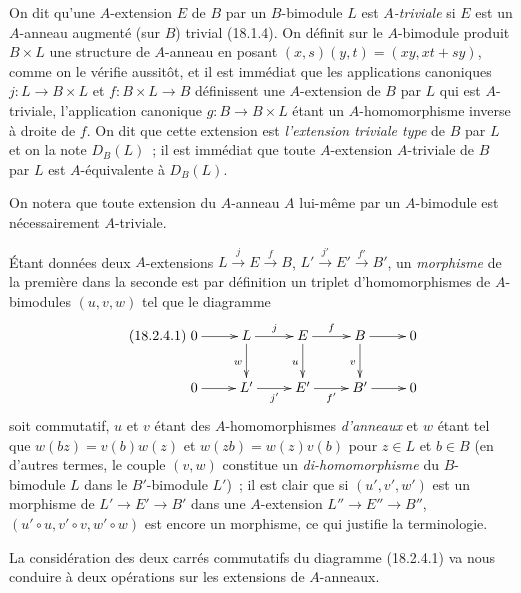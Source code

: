 \begin{env}[18.2.3]
\label{0.18.2.3-fr}
On dit qu'une $A$-extension $E$ de $B$ par un $B$-bimodule $L$ est
\emph{$A$-triviale} si $E$ est un $A$-anneau augmenté (sur $B$) trivial
(18.1.4). On définit sur le $A$-bimodule produit $B\times L$ une structure de
$A$-anneau en posant $(x,s)(y,t)=(xy,xt+sy)$, comme on le vérifie aussitôt,
et il est immédiat que les applications canoniques $j:L\to B\times L$ et
$f:B\times L\to B$ définissent une $A$-extension de $B$ par $L$ qui est
$A$-triviale, l'application canonique $g:B\to B\times L$ étant un
$A$-homomorphisme inverse à droite de $f$. On dit que cette extension est
\emph{l'extension triviale type} de $B$ par $L$ et on la note $D_B(L)$~; il
est immédiat que toute $A$-extension $A$-triviale de $B$ par $L$ est
$A$-équivalente à $D_B(L)$.

On notera que toute extension du $A$-anneau $A$ lui-même par un $A$-bimodule
est nécessairement $A$-triviale.
\end{env}

\begin{env}[18.2.4]
\label{0.18.2.4-fr}
Étant données deux $A$-extensions
$L\xrightarrow{j}E\xrightarrow{f}B$,
$L'\xrightarrow{j'}E'\xrightarrow{f'}B'$, un \emph{morphisme} de la première
dans la seconde est par définition un triplet d'homomorphismes de
$A$-bimodules $(u,v,w)$ tel que le diagramme
\begin{equation}
\label{0.18.2.4.1-fr}
\tag{18.2.4.1}
  \xymatrix{
    0\ar[r] & L\ar[r]^j\ar[d]_w & E\ar[r]^f\ar[d]_u
      & B\ar[r]\ar[d]_v & 0\\
    0\ar[r] & L'\ar[r]_{j'} & E'\ar[r]_{f'} & B'\ar[r] & 0
  }
\end{equation}
soit commutatif, $u$ et $v$ étant des $A$-homomorphismes \emph{d'anneaux} et
$w$ étant tel que $w(bz)=v(b)w(z)$ et $w(zb)=w(z)v(b)$ pour $z\in L$ et
$b\in B$ (en d'autres termes, le couple $(v,w)$ constitue un
\emph{di-homomorphisme} du $B$-bimodule $L$ dans le $B'$-bimodule $L'$)~; il
est clair que si $(u',v',w')$ est un morphisme de
$L'\to E'\to B'$ dans une $A$-extension $L''\to E''\to B''$,
$(u'\circ u,v'\circ v,w'\circ w)$ est encore un morphisme, ce qui justifie la
terminologie.

La considération des deux carrés commutatifs du diagramme (18.2.4.1) va nous
conduire à deux opérations sur les extensions de $A$-anneaux.
\end{env}

